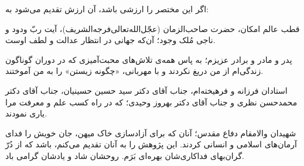 \begin{acknowledgementpage}

\vspace{1cm}

{\par}

\vspace{1cm}

اگر این مختصر را ارزشی باشد، آن ارزش تقدیم می‌شود به:

\vspace*{.6cm}

قطب عالم امکان، حضرت صاحب‌الزمان (عجّل‌الله‌تعالی‌فرجه‌الشریف)، آیت ربّ ودود و
ناجی مُلک وجود؛ آن‌که جهانی در انتظار عدالت و لطف اوست.

\vspace*{.6cm}

پدر و مادر و برادر عزیزم؛ به پاس همه‌ی تلاش‌های محبت‌آمیزی که در دوران گوناگون
زندگی‌ام از من دریغ نکردند و با مهربانی، «چگونه زیستن» را به من آموختند.

\vspace*{.6cm}

استادان فرزانه و فرهیخته‌ام، جناب آقای دکتر سید حسین حسینیان، جناب آقای دکتر
محمدحسن نظری و جناب آقای دکتر بهروز وحیدی؛ که در راه کسب علم و معرفت مرا یاری
نمودند.

\vspace*{.6cm}

شهیدان والامقام دفاع مقدس؛ آنان که برای آزادسازی خاک میهن، جان خویش را فدای
آرمان‌های اسلامی و انسانی کردند. این پژوهش را به آنان تقدیم می‌کنم، باشد که از
دُرّ گران‌بهای فداکاری‌شان بهره‌ای بَرَم. روحشان شاد و یادشان گرامی باد.

\end{acknowledgementpage}
\newpage

